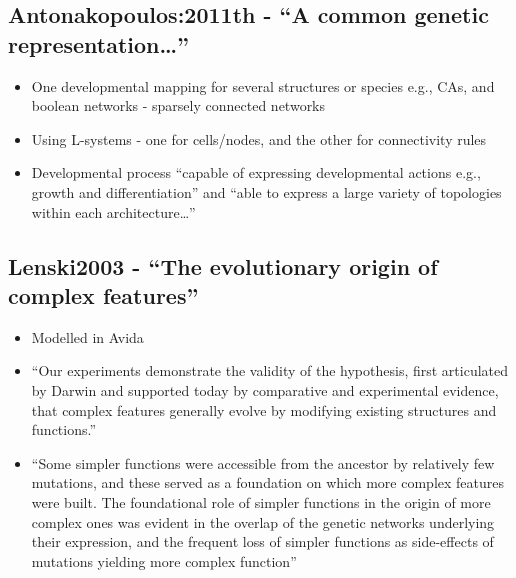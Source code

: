 		\hypertarget{antonakopoulos2011th---a-common-genetic-representation}{\subsection{Antonakopoulos:2011th
				- ``A common genetic
				representation\ldots{}''}\label{antonakopoulos2011th---a-common-genetic-representation}}
		
		\begin{itemize}
			\item
			
			One developmental mapping for several structures or species e.g., CAs,
			and boolean networks - sparsely connected networks
			
			\item
			
			Using L-systems - one for cells/nodes, and the other for connectivity
			rules
			
			\item
			
			Developmental process ``capable of expressing developmental actions
			e.g., growth and differentiation'' and ``able to express a large
			variety of topologies within each architecture\ldots{}''
			
		\end{itemize}
		
		\hypertarget{lenski2003---the-evolutionary-origin-of-complex-features}{\subsection{Lenski2003
				- ``The evolutionary origin of complex
				features''}\label{lenski2003---the-evolutionary-origin-of-complex-features}}
		
		\begin{itemize}
			\item
			
			Modelled in Avida
			
			\item
			
			``Our experiments demonstrate the validity of the hypothesis, first
			articulated by Darwin and supported today by comparative and
			experimental evidence, that complex features generally evolve by
			modifying existing structures and functions.''
			
			\item
			
			``Some simpler functions were accessible from the ancestor by
			relatively few mutations, and these served as a foundation on which
			more complex features were built. The foundational role of simpler
			functions in the origin of more complex ones was evident in the
			overlap of the genetic networks underlying their expression, and the
			frequent loss of simpler functions as side-effects of mutations
			yielding more complex function''
			
		\end{itemize}
		
